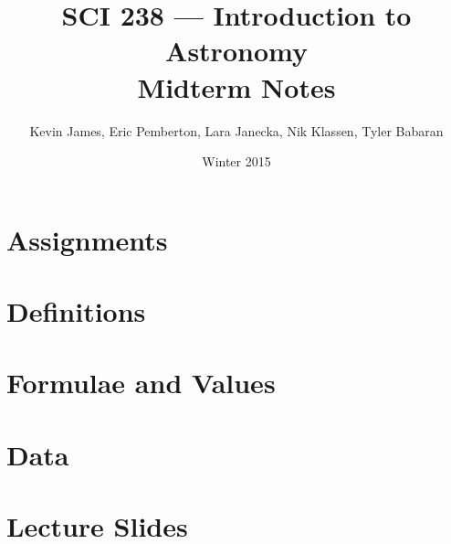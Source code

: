 \documentclass[12pt]{article}
\begin{document}
\title{SCI 238 --- Introduction to Astronomy \\ Midterm Notes}
\author{Kevin James, Eric Pemberton, Lara Janecka, Nik Klassen, Tyler Babaran}
\date{\vspace{-2ex}Winter 2015}
\maketitle\HRule

\tableofcontents
\newpage














\section{Assignments}


\section{Definitions}


\section{Formulae and Values}


\section{Data}


\section{Lecture Slides}











\end{document}

